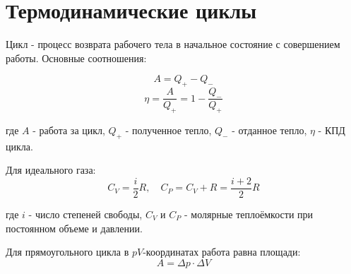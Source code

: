 \documentclass{article}
\begin{document}
\section*{Термодинамические циклы}

Цикл - процесс возврата рабочего тела в начальное состояние с совершением работы. Основные соотношения:

\[ A = Q_+ - Q_- \]
\[ \eta = \frac{A}{Q_+} = 1 - \frac{Q_-}{Q_+} \]

где $A$ - работа за цикл, $Q_+$ - полученное тепло, $Q_-$ - отданное тепло, $\eta$ - КПД цикла.

Для идеального газа:
\[ C_V = \frac{i}{2}R, \quad C_P = C_V + R = \frac{i+2}{2}R \]

где $i$ - число степеней свободы, $C_V$ и $C_P$ - молярные теплоёмкости при постоянном объеме и давлении.

Для прямоугольного цикла в $pV$-координатах работа равна площади:
\[ A = \Delta p \cdot \Delta V \]
\end{document}
